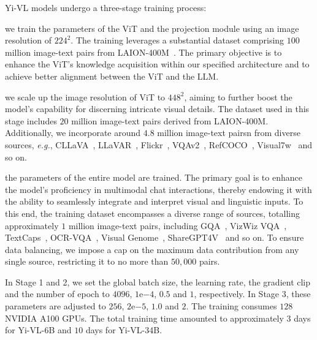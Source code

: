 \documentclass[numbers,sort&compress]{article}
\begin{document}
Yi-VL models undergo a three-stage training process: 
\begin{description}[leftmargin=0.2in]
    \item[Stage 1:] we train the parameters of the ViT and the projection module using an image resolution of $224^2$. The training leverages a substantial dataset comprising $100$ million image-text pairs from LAION-400M~\citep{schuhmann2021laion}. The primary objective is to enhance the ViT's knowledge acquisition within our specified architecture and to achieve better alignment between the ViT and the LLM. 
    \item[Stage 2:] we scale up the image resolution of ViT to $448^2$, aiming to further boost the model's capability for discerning intricate visual details. The dataset used in this stage includes $20$ million image-text pairs derived from LAION-400M. Additionally, we incorporate around $4.8$ million image-text pairsn from diverse sources, \textit{e.g.}, CLLaVA~\citep{linksoulai2023chinesellava}, LLaVAR~\citep{zhang2023llavar}, Flickr~\citep{young2014image}, VQAv2~\citep{goyal2017making}, RefCOCO~\citep{kazemzadeh2014referitgame}, Visual7w~\citep{zhu2016visual7w} and so on.
    \item[Stage 3:] the parameters of the entire model are trained. The primary goal is to enhance the model's proficiency in multimodal chat interactions, thereby endowing it with the ability to seamlessly integrate and interpret visual and linguistic inputs. To this end, the training dataset encompasses a diverse range of sources, totalling approximately $1$ million image-text pairs, including GQA~\citep{hudson2019gqa}, VizWiz VQA~\citep{gurari2018vizwiz}, TextCaps~\citep{sidorov2020textcaps}, OCR-VQA~\citep{mishra2019ocr}, Visual Genome~\citep{krishna2017visual}, ShareGPT4V~\citep{chen2023sharegpt4v} and so on. To ensure data balancing, we impose a cap on the maximum data contribution from any single source, restricting it to no more than $50,000$ pairs. 
\end{description}

In Stage 1 and 2, we set the global batch size, the learning rate, the gradient clip and the number of epoch to $4096$, $1$e$-4$, $0.5$ and $1$, respectively. In Stage 3, these parameters are adjusted to $256$, $2$e$-5$, $1.0$ and $2$. The training consumes $128$ NVIDIA A100 GPUs. The total training time amounted to approximately $3$ days for Yi-VL-6B and $10$ days for Yi-VL-34B. 
\end{document}
